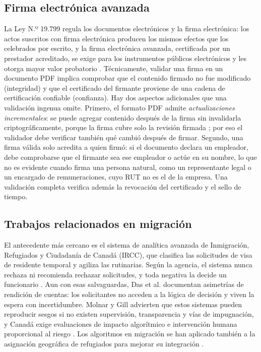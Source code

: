 \documentclass[11pt,a4paper]{article}
\begin{document}
\subsection{Firma electrónica avanzada}
La Ley N.º 19.799 regula los documentos electrónicos y la firma electrónica: los actos suscritos con firma electrónica producen los mismos efectos que los celebrados por escrito, y la firma electrónica avanzada, certificada por un prestador acreditado, se exige para los instrumentos públicos electrónicos y les otorga mayor valor probatorio \cite{ley19799}. Técnicamente, validar una firma en un documento PDF implica comprobar que el contenido firmado no fue modificado (integridad) y que el certificado del firmante proviene de una cadena de certificación confiable (confianza). Hay dos aspectos adicionales que una validación ingenua omite. Primero, el formato PDF admite \emph{actualizaciones incrementales}: se puede agregar contenido después de la firma sin invalidarla criptográficamente, porque la firma cubre solo la revisión firmada \cite{iso32000}; por eso el validador debe verificar también qué cambió después de firmar. Segundo, una firma válida solo acredita a quien firmó: si el documento declara un empleador, debe comprobarse que el firmante sea ese empleador o actúe en su nombre, lo que no es evidente cuando firma una persona natural, como un representante legal o un encargado de remuneraciones, cuyo RUT no es el de la empresa. Una validación completa verifica además la revocación del certificado y el sello de tiempo.

\subsection{Trabajos relacionados en migración}
El antecedente más cercano es el sistema de analítica avanzada de Inmigración, Refugiados y Ciudadanía de Canadá (IRCC), que clasifica las solicitudes de visa de residente temporal y agiliza las rutinarias. Según la agencia, el sistema nunca rechaza ni recomienda rechazar solicitudes, y toda negativa la decide un funcionario \cite{ircc2022}. Aun con esas salvaguardas, Das et al. \cite{dasd2026} documentan asimetrías de rendición de cuentas: los solicitantes no acceden a la lógica de decisión y viven la espera con incertidumbre. Molnar y Gill \cite{molnar2018} advierten que estos sistemas pueden reproducir sesgos si no existen supervisión, transparencia y vías de impugnación, y Canadá exige evaluaciones de impacto algorítmico e intervención humana proporcional al riesgo \cite{canada2019}. Los algoritmos en migración se han aplicado también a la asignación geográfica de refugiados para mejorar su integración \cite{bansak2018}.
\end{document}
